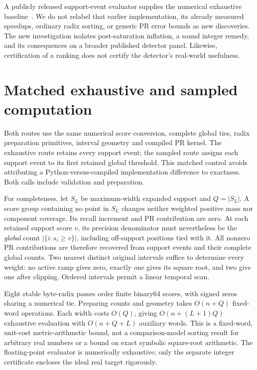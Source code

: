\documentclass[10pt]{article}
\begin{document}
A publicly released support-event evaluator supplies the numerical
exhaustive baseline~\citep{sparsevus03}. We do not relabel that earlier
implementation, its already measured speedups, ordinary radix sorting, or
generic PR error bounds as new discoveries. The new investigation isolates
post-saturation inflation, a sound integer remedy, and its consequences on
a broader published detector panel. Likewise, certification of a ranking
does not certify the detector's real-world usefulness.



\section{Matched exhaustive and sampled computation}
\label{sec:matched-computation}
Both routes use the same numerical score conversion, complete global ties,
radix preparation primitives, interval geometry and compiled PR kernel.
The exhaustive route retains every support event; the sampled route
assigns each support event to its first retained global threshold. This
matched control avoids attributing a Python-versus-compiled implementation
difference to exactness. Both calls include validation and preparation.

For completeness, let $S_L$ be maximum-width expanded support and
$Q=|S_L|$. A score group containing no point in $S_L$ changes neither
weighted positive mass nor component coverage. Its recall increment and
PR contribution are zero. At each retained support score $v$, its
precision denominator must nevertheless be the \emph{global} count
$|\{i:s_i\geq v\}|$, including off-support positions tied with it.
All nonzero PR contributions are therefore recovered from support events
and their complete global counts. Two nearest distinct original intervals
suffice to determine every weight: no active ramp gives zero, exactly one
gives its square root, and two give one after clipping. Ordered intervals
permit a linear temporal scan.

Eight stable byte-radix passes order finite binary64 scores, with signed
zeros sharing a numerical tie. Preparing counts and geometry takes
$O(n+Q)$ fixed-word operations. Each width costs $O(Q)$, giving
$O(n+(L+1)Q)$ exhaustive evaluation with $O(n+Q+L)$ auxiliary words.
This is a fixed-word, unit-cost metric-arithmetic bound, not a
comparison-model sorting result for arbitrary real numbers or a bound on
exact symbolic square-root arithmetic. The floating-point evaluator is
numerically exhaustive; only the separate integer certificate encloses
the ideal real target rigorously.
\end{document}
